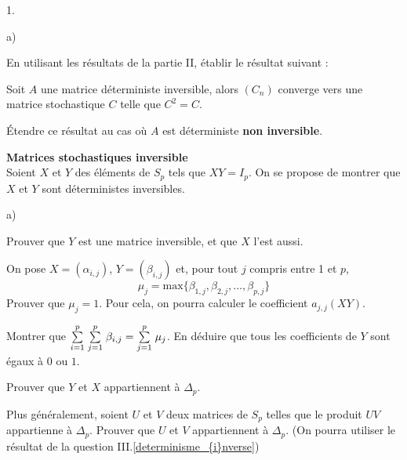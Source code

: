 \documentclass[11pt]{article}%
\begin{document}
\begin{noliste}{1.}
\begin{noliste}{a)}
 \setlength{\itemsep}{2mm}
\item En utilisant les résultats de la partie II, établir le résultat
suivant : 

Soit $A$ une matrice déterministe inversible, alors $(C_{n})$ converge
vers
une matrice stochastique $C$ telle que $C^{2} = C$. 

\item Étendre ce résultat au cas où $A$ est déterministe \textbf{non
inversible}. 
\end{noliste}

\item \textbf{Matrices stochastiques inversible}\\
Soient $X$ et $Y$ des éléments de $S_{p}$ tels que $XY = I_{p}$. On se
propose
de montrer que $X$ et $Y$ sont déterministes inversibles. 

\begin{noliste}{a)}
 \setlength{\itemsep}{2mm}
\item Prouver que $Y$ est une matrice inversible, et que $X$ l'est
aussi. 

\item On pose $X = (\alpha_{i,j})$, $Y = (\beta_{i,j})$ et, pour tout
$j$
compris entre 1 et $p$, 
\[
\mu_{j} = \text{max}\{\beta_{1,j},\beta_{2,j},\ldots,\beta_{p,j}\}
\]
Prouver que $\mu_{j} = 1$. Pour cela, on pourra calculer le coefficient
$a_{j,j}(XY)$. 

\item Montrer que ${\textstyle\sum\limits_{i = 1}^{p}}\hspace{.1cm}{\textstyle\sum\limits_{j = 1}^{p}}\hspace{.1cm}\beta
_{i,j} = {\textstyle\sum\limits_{j = 1}^{p}}\hspace{.1cm}\mu_{j}$. En déduire que tous les coefficients
de $Y$ sont égaux à $0$ ou $1$. 

\item Prouver que $Y$ et $X$ appartiennent à $\Delta_{p}$. 

\item Plus généralement, soient $U$ et $V$ deux matrices de $S_{p}$
telles
que le produit $UV$ appartienne à $\Delta_{p}$. Prouver que $U$ et $V$
appartiennent à $\Delta_{p}$. (On pourra utiliser le résultat de la
question III.\ref{determinisme_{i}nverse}) 
\end{noliste}
\end{noliste}

\label{fin}
\end{document}
